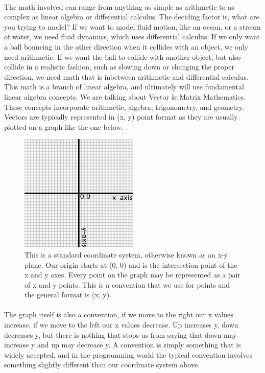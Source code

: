 \documentclass[12pt, letterpaper]{report}
\begin{document}
	\paragraph{}The math involved can range from anything as simple as arithmetic to as complex as linear algebra or differential calculus. The deciding factor is, what are you trying to model? If we want to model fluid motion, like an ocean, or a stream of water, we need fluid dynamics, which uses differential calculus. If we only want a ball bouncing in the other direction when it collides with an object, we only need arithmetic. If we want the ball to collide with another object, but also collide in a realistic fashion, such as slowing down or changing the proper direction, we need math that is inbetween arithmetic and differential calculus. This math is a branch of linear algebra, and ultimately will use fundamental linear algebra concepts. We are talking about Vector \& Matrix Mathematics. These concepts incorporate arithmetic, algebra, trigonometry, and geometry. Vectors are typically represented in (x, y) point format as they are usually plotted on a graph like the one below.
\vspace{-\baselineskip}
	\begin{figure}[h]
	\centering
	\includegraphics[width=0.5\textwidth]{Processing Images/ConventionalCoordinates/ConventionalCoordinates.jpg}
	\caption{This is a standard coordinate system, otherwise known as an x-y plane. Our origin starts at (0, 0) and is the intersection point of the x and y axes. Every point on the graph may be represented as a pair of x and y points. This is a convention that we use for points and the general format is (x, y).}
	\end{figure}
\newpage
	\paragraph{}The graph itself is also a convention, if we move to the right our x values increase, if we move to the left our x values decrease. Up increases y, down decreases y, but there is nothing that stops us from saying that down may increase y and up may decrease y. A convention is simply something that is widely accepted, and in the programming world the typical convention involves something slightly different than our coordinate system above.
\end{document}
